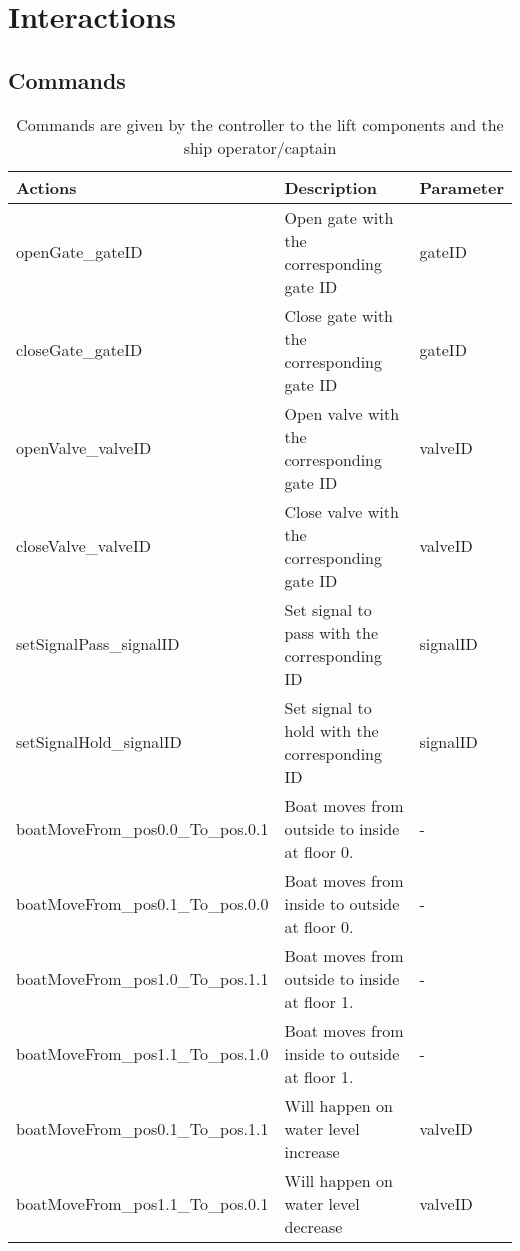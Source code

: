 \section{Interactions}

\subsection{Commands}
\begin{table}[htbp]
	\centering
	\caption{Commands are given by the controller to the lift components and the ship operator/captain}
	\begin{tabular}{lll}
		\toprule
		\textbf{Actions} & \textbf{Description} & \textbf{Parameter} \\
		\midrule
		openGate\_gateID & Open gate with the corresponding gate ID & gateID \\
		closeGate\_gateID & Close gate with the corresponding gate ID & gateID \\
		openValve\_valveID & Open valve with the corresponding gate ID & valveID \\
		closeValve\_valveID & Close valve with the corresponding gate ID & valveID \\
		setSignalPass\_signalID & Set signal to pass with the corresponding ID  & signalID \\
		setSignalHold\_signalID & Set signal to hold with the corresponding ID  & signalID \\
		boatMoveFrom\_pos0.0\_To\_pos.0.1 & Boat moves from outside to inside at floor 0. & - \\
		boatMoveFrom\_pos0.1\_To\_pos.0.0 & Boat moves from inside to outside at floor 0. & - \\
		boatMoveFrom\_pos1.0\_To\_pos.1.1 & Boat moves from outside to inside at floor 1. & - \\
		boatMoveFrom\_pos1.1\_To\_pos.1.0 & Boat moves from inside to outside at floor 1. & - \\
		boatMoveFrom\_pos0.1\_To\_pos.1.1 & Will happen on water level increase & valveID \\
		boatMoveFrom\_pos1.1\_To\_pos.0.1 & Will happen on water level decrease & valveID \\
		\bottomrule
		\end{tabular}%
		\label{tab:addlabel}%
		\end{table}%
		
		
